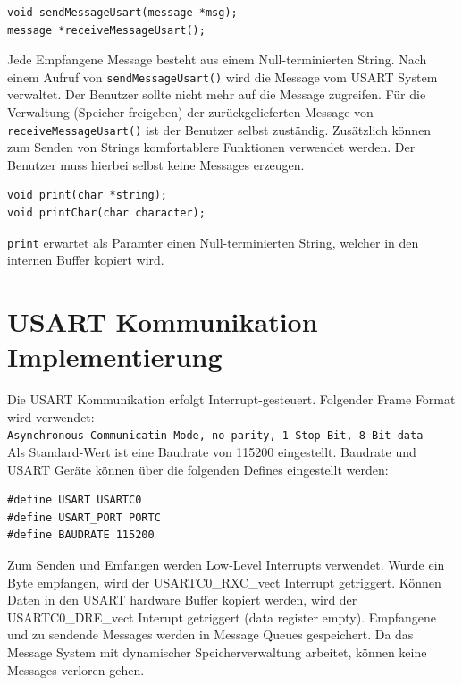 \documentclass[fontsize=12pt, toc=bibliography, notitlepage]{scrreprt}
\begin{document}
\begin{lstlisting}
void sendMessageUsart(message *msg);
message *receiveMessageUsart();
\end{lstlisting}

Jede Empfangene Message besteht aus einem Null-terminierten String. Nach einem Aufruf von \lstinline$sendMessageUsart()$ wird die Message vom USART System verwaltet. Der Benutzer sollte nicht mehr auf die Message zugreifen. Für die Verwaltung (Speicher freigeben) der zurückgelieferten Message von \lstinline$receiveMessageUsart()$ ist der Benutzer selbst zuständig. Zusätzlich können zum Senden von Strings komfortablere Funktionen verwendet werden. Der Benutzer muss hierbei selbst keine Messages erzeugen.\\

\begin{lstlisting}
void print(char *string);
void printChar(char character);
\end{lstlisting}

\lstinline$print$ erwartet als Paramter einen Null-terminierten String, welcher in den internen Buffer kopiert wird.

\section{USART Kommunikation Implementierung}
\label{subsec:shell-communication-impl}
Die USART Kommunikation erfolgt Interrupt-gesteuert. Folgender Frame Format wird verwendet:\\

\lstinline{Asynchronous Communicatin Mode, no parity, 1 Stop Bit, 8 Bit data}\\

Als Standard-Wert ist eine Baudrate von 115200 eingestellt. Baudrate und USART Geräte können über die folgenden Defines eingestellt werden:\\

\begin{lstlisting}
#define USART USARTC0
#define USART_PORT PORTC
#define BAUDRATE 115200
\end{lstlisting}

Zum Senden und Emfangen werden Low-Level Interrupts verwendet. Wurde ein Byte empfangen, wird der USARTC0\_RXC\_vect Interrupt getriggert. Können Daten in den USART hardware Buffer kopiert werden, wird der USARTC0\_DRE\_vect Interupt getriggert (data register empty). Empfangene und zu sendende Messages werden in Message Queues gespeichert. Da das Message System mit dynamischer Speicherverwaltung arbeitet, können keine Messages verloren gehen.\\
\end{document}
